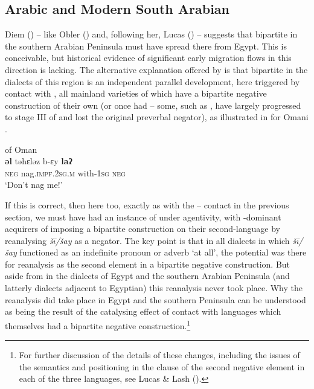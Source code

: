 \documentclass[output=paper]{langsci/langscibook}
\begin{document}
\subsection{Arabic and Modern South Arabian}

Diem (\citeyear[73]{Diem2014}) -- like Obler (\citeyear[148]{Obler1990}) and, following her, Lucas (\citeyear[416]{Lucas2007}) -- suggests that bipartite  in the southern Arabian Peninsula must have spread there from Egypt. This is conceivable, but historical evidence of significant early migration flows in this direction is lacking. The alternative explanation offered by \citet{LucasLash2010} is that bipartite  in the  dialects of this region is an independent parallel development, here triggered by contact with , all mainland varieties of which have a bipartite negative construction of their own (or once had – some, such as , have largely progressed to stage III of  and lost the original preverbal negator), as illustrated in  for Omani .

\ea\label{meh1}
{        of Oman \citep[23]{Johnstone1987}}\\
\gll \textbf{əl} təhɛləz b-ɛy \textbf{laʔ}\\
     \textsc{neg} nag.\textsc{impf.2sg.m} with-\textsc{1sg} \textsc{neg} \\
\glt ‘Don’t nag me!’
\z

If this is correct, then here too, exactly as with the – contact in the previous section, we must have had an instance of  under  agentivity, with -dominant acquirers of  imposing a bipartite construction on their second-language  by reanalysing \textit{šī/šay} as a negator. The key point is that in all dialects in which \textit{šī/šay} functioned as an indefinite pronoun or adverb ‘at all’, the potential was there for reanalysis as the second element in a bipartite negative construction. But aside from in the dialects of Egypt and the southern Arabian Peninsula (and latterly dialects adjacent to Egyptian) this reanalysis never took place. Why the reanalysis did take place in Egypt and the southern Peninsula can be understood as being the result of the catalysing effect of contact with languages which themselves had a bipartite negative construction.\footnote{For further discussion of the details of these changes, including the issues of the semantics and positioning in the clause of the second negative element in each of the three languages, see Lucas \& Lash (\citeyear[395–401]{LucasLash2010}).}
\end{document}
